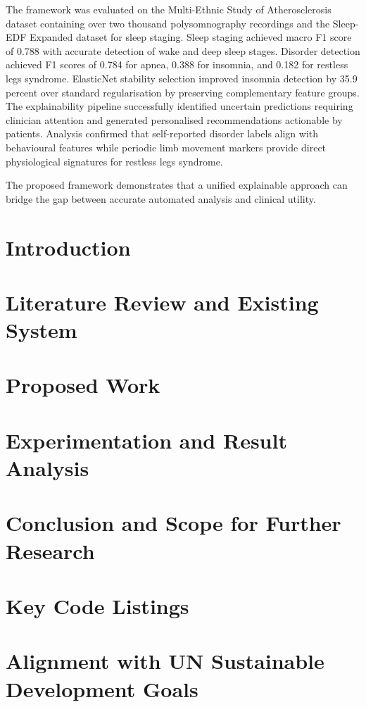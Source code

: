 \documentclass[a4paper, 12pt]{report}
\theoremstyle{definition}
\begin{document}
The framework was evaluated on the Multi-Ethnic Study of Atherosclerosis dataset containing over two thousand polysomnography recordings and the Sleep-EDF Expanded dataset for sleep staging. Sleep staging achieved macro F1 score of 0.788 with accurate detection of wake and deep sleep stages. Disorder detection achieved F1 scores of 0.784 for apnea, 0.388 for insomnia, and 0.182 for restless legs syndrome. ElasticNet stability selection improved insomnia detection by 35.9 percent over standard regularisation by preserving complementary feature groups. The explainability pipeline successfully identified uncertain predictions requiring clinician attention and generated personalised recommendations actionable by patients. Analysis confirmed that self-reported disorder labels align with behavioural features while periodic limb movement markers provide direct physiological signatures for restless legs syndrome.

The proposed framework demonstrates that a unified explainable approach can bridge the gap between accurate automated analysis and clinical utility.

\clearpage
{}
\setcounter{page}{1}
\chapter{Introduction}

\chapter{Literature Review and Existing System}

\chapter{Proposed Work}

\chapter{Experimentation and Result Analysis}

\chapter{Conclusion and Scope for Further Research}

\appendix
\chapter{Key Code Listings}

\chapter{Alignment with UN Sustainable Development Goals}


\newpage
\renewcommand{\bibname}{References}


\end{document}
